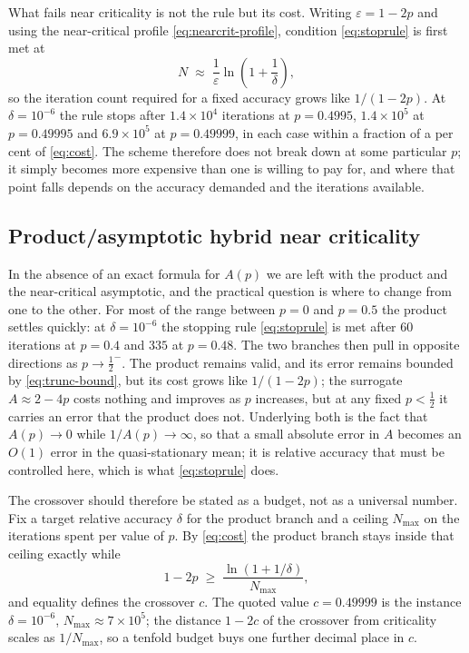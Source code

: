 What fails near criticality is not the rule but its cost. Writing $\varepsilon=1-2p$ and
using the near-critical profile \eqref{eq:nearcrit-profile}, condition
\eqref{eq:stoprule} is first met at
\begin{equation}
N\;\approx\;\frac{1}{\varepsilon}\ln\!\left(1+\frac{1}{\delta}\right),
\label{eq:cost}
\end{equation}
so the iteration count required for a fixed accuracy grows like $1/(1-2p)$. At
$\delta=10^{-6}$ the rule stops after $1.4\times10^{4}$ iterations at
$p=0.4995$, $1.4\times10^{5}$ at $p=0.49995$ and $6.9\times10^{5}$ at
$p=0.49999$, in each case within a fraction of a per cent of \eqref{eq:cost}.
The scheme therefore does not break down at some particular $p$; it simply becomes
more expensive than one is willing to pay for, and where that point falls depends
on the accuracy demanded and the iterations available.

\subsection{Product/asymptotic hybrid near criticality}


In the absence of an exact formula for $A(p)$ we are left with the product and the
near-critical asymptotic, and the practical question is where to change from one to
the other. For most of the range between $p=0$ and $p=0.5$ the product settles
quickly: at $\delta=10^{-6}$ the stopping rule \eqref{eq:stoprule} is met after $60$
iterations at $p=0.4$ and $335$ at $p=0.48$. The two branches then pull in opposite
directions as $p\to\tfrac12^-$. The product remains valid, and its error remains
bounded by \eqref{eq:trunc-bound}, but its cost grows like $1/(1-2p)$; the
surrogate $A\approx2-4p$ costs nothing and improves as $p$ increases, but at any
fixed $p<\tfrac12$ it carries an error that the product does not. Underlying both
is the fact that $A(p)\to0$ while $1/A(p)\to\infty$, so that a small absolute error
in $A$ becomes an $O(1)$ error in the quasi-stationary mean; it is relative
accuracy that must be controlled here, which is what \eqref{eq:stoprule} does.

The crossover should therefore be stated as a budget, not as a universal number.
Fix a target relative accuracy $\delta$ for the product branch and a ceiling
$N_{\max}$ on the iterations spent per value of $p$. By \eqref{eq:cost} the product
branch stays inside that ceiling exactly while
\begin{equation}
1-2p\;\ge\;\frac{\ln\!\left(1+1/\delta\right)}{N_{\max}},
\label{eq:crossover}
\end{equation}
and equality defines the crossover $c$. The quoted value $c=0.49999$ is the
instance $\delta=10^{-6}$, $N_{\max}\approx7\times10^{5}$; the distance $1-2c$ of
the crossover from criticality scales as $1/N_{\max}$, so a tenfold budget buys one
further decimal place in $c$.

